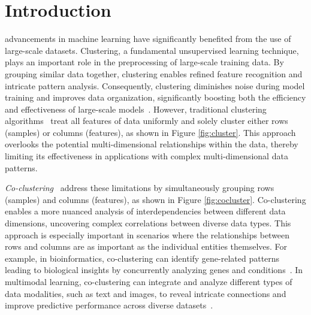 \documentclass[journal]{IEEEtran}
\renewcommand{\cite}[1]{~\autocite{#1}}
\begin{document}
\section{Introduction}
 advancements in machine learning have significantly benefited from the use of large-scale datasets. Clustering, a fundamental unsupervised learning technique, plays an important role in the preprocessing of large-scale training data. By grouping similar data together, clustering enables refined feature recognition and intricate pattern analysis. Consequently, clustering diminishes noise during model training and improves data organization, significantly boosting both the efficiency and effectiveness of large-scale models\cite{raskutti2002CombiningClusteringCotraining, li2014ClusteringguidedSparseStructural, ghimatgar2018ImprovedFeatureSelection, li2023DistributedClusteringCooperative, bertsimas2020InterpretableClusteringOptimization}. However, traditional clustering algorithms\cite{lloyd1982LeastSquaresQuantization, arthur2007KmeansAdvantagesCareful, mclachlan1987MixtureModelsInference} treat all features of data uniformly and solely cluster either rows (samples) or columns (features), as shown in Figure \ref{fig:cluster}. This approach overlooks the potential multi-dimensional relationships within the data, thereby limiting its effectiveness in applications with complex multi-dimensional data patterns.

\textit{Co-clustering}\cite{cheng2000BiclusteringExpressionData, kluger2003SpectralBiclusteringMicroarray, yan2017CoclusteringMultidimensionalBig,wu2024AccurateDetectionEllipses} address these limitations by simultaneously grouping rows (samples) and columns (features), as shown in Figure \ref{fig:cocluster}. Co-clustering enables a more nuanced analysis of interdependencies between different data dimensions, uncovering complex correlations between diverse data types. This approach is especially important in scenarios where the relationships between rows and columns are as important as the individual entities themselves. For example, in bioinformatics, co-clustering can identify gene-related patterns leading to biological insights by concurrently analyzing genes and conditions\cite{higham2007SpectralClusteringIts, kluger2003SpectralBiclusteringMicroarray, madeira2004BiclusteringAlgorithmsBiological, zhao2012BiclusteringAnalysisPattern, golchev2015BiclusteringAnalysisGene}.
In multimodal learning, co-clustering can integrate and analyze different types of data modalities, such as text and images, to reveal intricate connections and improve predictive performance across diverse datasets\cite{mu2022LearningHybridBehavior}.
\end{document}
